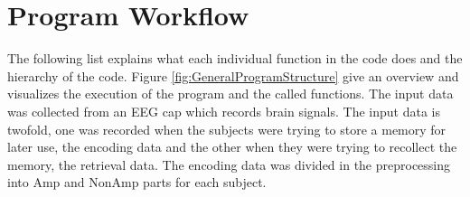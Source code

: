 \documentclass[12pt, a4paper]{article}
\begin{document}
\section{Program Workflow}

The following list explains what each individual function in the code does and the hierarchy of the code.
Figure \ref{fig:GeneralProgramStructure} give an overview and visualizes the execution of the program and the called functions.
The input data was collected from an EEG cap which records brain signals.
The input data is twofold, one was recorded when the subjects were trying to store a memory for later use, the encoding data and the other when they were trying to recollect the memory, the retrieval data.
The encoding data was divided in the preprocessing into Amp and NonAmp parts for each subject.%
\end{document}
